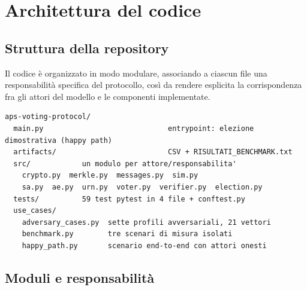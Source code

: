 \section{Architettura del codice}
\label{sec:wp4_architettura}

\subsection{Struttura della repository}
\label{subsec:wp4_repo}

Il codice è organizzato in modo modulare, associando a ciascun file una
responsabilità specifica del protocollo, così da rendere esplicita la
corrispondenza fra gli attori del modello e le componenti implementate.

\begin{lstlisting}[style=consolewp4]
aps-voting-protocol/
  main.py                             entrypoint: elezione dimostrativa (happy path)
  artifacts/                          CSV + RISULTATI_BENCHMARK.txt
  src/            un modulo per attore/responsabilita'
    crypto.py  merkle.py  messages.py  sim.py
    sa.py  ae.py  urn.py  voter.py  verifier.py  election.py
  tests/          59 test pytest in 4 file + conftest.py
  use_cases/
    adversary_cases.py  sette profili avversariali, 21 vettori
    benchmark.py        tre scenari di misura isolati
    happy_path.py       scenario end-to-end con attori onesti
\end{lstlisting}

\subsection{Moduli e responsabilità}
\label{subsec:wp4_moduli}


